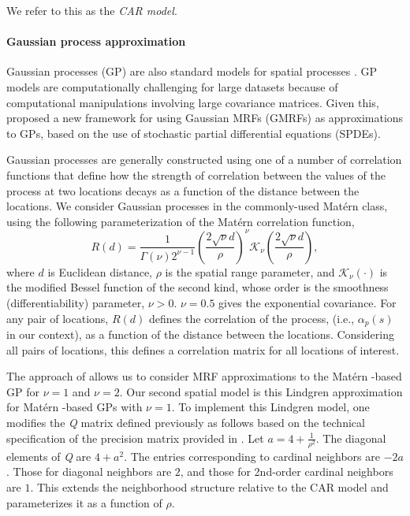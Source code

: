 \documentclass[10pt,letterpaper]{article}
\newcommand{\matern}{Mat\'{e}rn }
\begin{document}
We refer to this as the \emph{CAR model}.



\paragraph{Gaussian process approximation}

Gaussian processes (GP) are also standard models for spatial processes \cite{Bane:etal:2004}.
GP models are computationally challenging for large datasets because
of computational manipulations involving large covariance
matrices. Given this, \cite{Lind:etal:2011} proposed a new framework
for using Gaussian MRFs (GMRFs) as approximations to GPs, based on
the use of stochastic partial differential equations (SPDEs).

Gaussian processes are generally constructed using
one of a number of correlation functions that define how the strength
of correlation between the values of the process at two locations
decays as a function of the distance between the locations. We consider
Gaussian processes in the commonly-used \matern
class, using the following parameterization of the \matern correlation
function, 
\begin{equation}
R(d)=\frac{1}{\Gamma(\nu)2^{\nu-1}}\left(\frac{2\sqrt{\nu}d}{\rho}\right)^{\nu}\mathcal{K}_{\nu}\left(\frac{2\sqrt{\nu}d}{\rho}\right),\nonumber
\end{equation}
where $d$ is Euclidean distance, $\rho$ is the spatial range parameter,
and $\mathcal{K}_{\nu}(\cdot)$ is the modified Bessel function of
the second kind, whose order is the smoothness (differentiability)
parameter, $\nu>0$. $\nu=0.5$ gives the exponential covariance.
For any pair of locations, $R(d)$ defines the correlation of the
process, (i.e., $\alpha_{p}(s)$ in our context), as a function of
the distance between the locations. Considering all pairs of locations,
this defines a correlation matrix for all locations of interest. 

The approach of \cite{Lind:etal:2011} allows us to consider MRF
approximations to the \matern-based GP for $\nu=1$ and $\nu=2$.
Our second spatial model is this Lindgren approximation for \matern-based
GPs with $\nu=1$. To implement this Lindgren model, one modifies
the \emph{Q} matrix defined previously as follows based
on the technical specification of the precision matrix provided in
\cite{Lind:etal:2011}. Let $a=4+\frac{1}{\rho^{2}}$. The diagonal
elements of \emph{Q} are $4+a^{2}$. The entries corresponding to cardinal
neighbors are $-2a$. Those for diagonal neighbors are $2$, and those
for 2nd-order cardinal neighbors are $1$. This extends the neighborhood
structure relative to the CAR model and parameterizes it as a function
of $\rho$.
\end{document}
